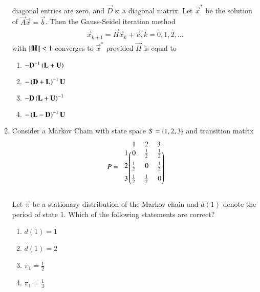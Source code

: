 \begin{enumerate}[label=\thesection.\arabic*.,ref=\thesection.\theenumi]
diagonal entries are zero, and $\vec{D}$ si a diagonal matrix.  Let $\vec{x}^{*}$ be the solution of
$\vec{A}\vec{x} = \vec{b}$.  Then the Gauss-Seidel iteration method 
\begin{align}
\vec{x}_{k+1} = \vec{H}\vec{x}_{k}+\vec{c}, k = 0,1,2,\dots
\end{align}
%
with $\left\lVert\mathbf{H}\right\rVert < 1$ converges to $\vec{x}^{*}$ provided $\vec{H}$ is equal to
\begin{enumerate}
\item $-\mathbf{D}^{-1}\left(\mathbf{L}+\mathbf{U}\right)$
\item $-\left(\mathbf{D}+\mathbf{L}\right)^{-1}\mathbf{U}$
\item $-\mathbf{D}\left(\mathbf{L}+\mathbf{U}\right)^{-1}$
\item $-\left(\mathbf{L}-\mathbf{D}\right)^{-1}\mathbf{U}$
\end{enumerate}
\item Consider a Markov Chain with state space $S = \left\{1,2, 3\right\}$ and transition matrix
\begin{align}
P = 
\begin{blockarray}{c@{\hspace{1pt}}rrr@{\hspace{3pt}}}
            & 1   & 2 & 3 \\
        \begin{block}{r@{\hspace{3pt}}@{\hspace{1pt}}
    (@{\hspace{1pt}}rrr@{\hspace{1pt}}@{\hspace{1pt}})}
        1 &  0 & \frac{1}{2} & \frac{1}{2}   \\ [2mm]
        2 & \frac{1}{2}  & 0 & \frac{1}{2}\\ [2mm]
        3 & \frac{1}{2}  &  \frac{1}{2} & 0  \\ [2mm]
%
        \end{block}
    \end{blockarray}
\end{align}
%
Let $\vec{\pi}$ be a stationary distribution of the Markov chain and $d(1)$ denote the
period of state 1.  Which of the following statements are correct?
\begin{enumerate}
\item $d(1) = 1$
\item $d(1) = 2$
\item $\pi_1 = \frac{1}{2}$
\item $\pi_1 = \frac{1}{3}$
\end{enumerate}
\solution


\end{enumerate}
